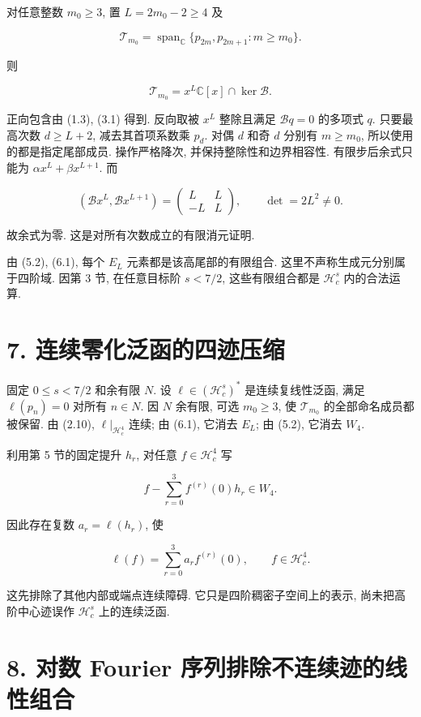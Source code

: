 \documentclass[UTF8,fontset=fandol,11pt,a4paper]{ctexart}
\begin{document}
对任意整数 \(m_0\ge3\), 置 \(L=2m_0-2\ge4\) 及


\[
 \mathcal T_{m_0}
 =\operatorname{span}_{\mathbb C}\{p_{2m},p_{2m+1}:m\ge m_0\}.
\]


则


\[
 \boxed{\mathcal T_{m_0}=x^L\mathbb C[x]\cap\ker\mathcal B.}
 \tag{6.1}
\]


正向包含由 (1.3), (3.1) 得到. 反向取被 \(x^L\) 整除且满足 \(\mathcal Bq=0\) 的多项式 \(q\). 只要最高次数 \(d\ge L+2\), 减去其首项系数乘 \(p_d\). 对偶 \(d\) 和奇 \(d\) 分别有 \(m\ge m_0\), 所以使用的都是指定尾部成员. 操作严格降次, 并保持整除性和边界相容性. 有限步后余式只能为 \(\alpha x^L+\beta x^{L+1}\). 而


\[
 (\mathcal Bx^L,\mathcal Bx^{L+1})=
 \begin{pmatrix}L&L\\-L&L\end{pmatrix},
 \qquad\det=2L^2\ne0.
 \tag{6.2}
\]


故余式为零. 这是对所有次数成立的有限消元证明.


由 (5.2), (6.1), 每个 \(E_L\) 元素都是该高尾部的有限组合. 这里不声称生成元分别属于四阶域. 因第 3 节, 在任意目标阶 \(s<7/2\), 这些有限组合都是 \(\mathcal H_c^s\) 内的合法运算.


\section*{7. 连续零化泛函的四迹压缩}

固定 \(0\le s<7/2\) 和余有限 \(N\). 设
\(\ell\in(\mathcal H_c^s)^*\) 是连续复线性泛函, 满足 \(\ell(p_n)=0\) 对所有 \(n\in N\).
因 \(N\) 余有限, 可选 \(m_0\ge3\), 使 \(\mathcal T_{m_0}\) 的全部命名成员都被保留. 由 (2.10), \(\ell|_{\mathcal H_c^4}\) 连续; 由 (6.1), 它消去 \(E_L\); 由 (5.2), 它消去 \(W_4\).


利用第 5 节的固定提升 \(h_r\), 对任意 \(f\in\mathcal H_c^4\) 写


\[
 f-\sum_{r=0}^3 f^{(r)}(0)h_r\in W_4.
\]


因此存在复数 \(a_r=\ell(h_r)\), 使


\[
 \ell(f)=\sum_{r=0}^3a_rf^{(r)}(0),\qquad f\in\mathcal H_c^4.
 \tag{7.1}
\]


这先排除了其他内部或端点连续障碍. 它只是四阶稠密子空间上的表示, 尚未把高阶中心迹误作 \(\mathcal H_c^s\) 上的连续泛函.


\section*{8. 对数 Fourier 序列排除不连续迹的线性组合}
\end{document}
